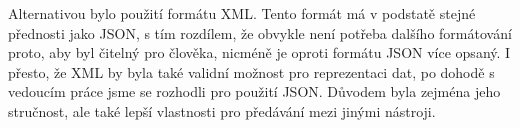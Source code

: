 			Alternativou bylo použití formátu XML. Tento formát má v podstatě stejné přednosti jako JSON, s tím rozdílem, že obvykle není potřeba dalšího formátování proto, aby byl čitelný pro člověka, nicméně je oproti formátu JSON více opsaný. I přesto, že XML by byla také validní možnost pro reprezentaci dat, po dohodě s vedoucím práce jsme se rozhodli pro použití JSON. Důvodem byla zejména jeho stručnost, ale také lepší vlastnosti pro předávání mezi jinými nástroji.